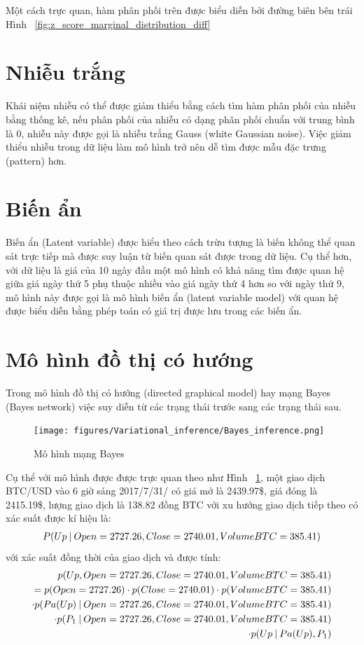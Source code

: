 Một cách trực quan, hàm phân phối trên được biểu diễn bởi đường biên bên trái Hình ~\ref{fig:z_score_marginal_distribution_diff}

\section{Nhiễu trắng}
Khái niệm nhiễu có thể được giảm thiểu bằng cách tìm hàm phân phối của nhiễu bằng thống kê, nếu phân phối của nhiễu có dạng phân phối chuẩn với trung bình là 0, nhiễu này được gọi là nhiễu trắng Gauss (white Gaussian noise). Việc giảm thiểu nhiễu trong dữ liệu làm mô hình trở nên dễ tìm được mẫu đặc trưng (pattern) hơn.

\section{Biến ẩn}
Biến ẩn (Latent variable) được hiểu theo cách trừu tượng là biến không thể quan sát trực tiếp\cite[trang~264]{bishop} 
mà được suy luận từ biến quan sát được trong dữ liệu. Cụ thể hơn, với dữ liệu là giá của 10 ngày đầu một mô hình có khả năng tìm được quan hệ giữa giá ngày thứ 5 phụ thuộc nhiều vào giá ngày thứ 4 hơn so với ngày thứ 9, mô hình này được gọi là mô hình biến ẩn (latent variable model) với quan hệ được biểu diễn bằng phép toán có giá trị được lưu trong các biến ẩn.
\section{Mô hình đồ thị có hướng}
Trong mô hình đồ thị có hướng (directed graphical model) hay mạng Bayes (Bayes network) việc suy diễn từ các trạng thái trước sang các trạng thái sau.
\begin{figure}[hbt!]
	\center	\texttt{[image: figures/Variational\_inference/Bayes\_inference.png]}
	\caption{Mô hình mạng Bayes}
	\label{fig:Bayes_inference}
\end{figure}
Cụ thể với mô hình được được trực quan theo như Hình ~\ref{fig:Bayes_inference}, một giao dịch BTC/USD vào 6 giờ sáng 2017/7/31/ có giá mở là 2439.97\$, giá đóng là 2415.19\$, lượng giao dịch là 138.82 đồng BTC với xu hướng giao dịch tiếp theo có xác suất được kí hiệu là:
\begin{align*}
 P(Up \:\lvert\: Open =2727.26, Close=2740.01, Volume BTC = 385.41)   
\end{align*} với xác suất đồng thời của giao dịch và được tính:
\begin{align*}
p(Up,Open = 2727.26, Close = 2740.01, Volume BTC = 385.41)\\
= p(Open = 2727.26) \cdot p(Close = 2740.01) \cdot p(Volume BTC = 385.41)\\
\cdot p(Pa(Up) \:\lvert\: Open =2727.26, Close=2740.01, Volume BTC = 385.41)\\
\cdot p(P_1 \:\lvert\: Open =2727.26, Close=2740.01, Volume BTC = 385.41)\\
\cdot p(Up \:\lvert\: Pa(Up), P_1)
\end{align*}

